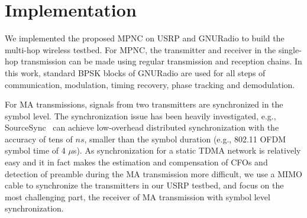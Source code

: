 \section{Implementation}
We implemented the proposed MPNC on USRP and GNURadio to build the multi-hop wireless testbed.
For MPNC, the transmitter and receiver in the single-hop transmission can be made using regular transmission and reception chains. In this work, standard BPSK blocks of GNURadio are used for all steps of communication, modulation, timing recovery, phase tracking and demodulation.

For  MA transmissions, signals from two transmitters are synchronized in the symbol level. The synchronization issue has been heavily investigated, e.g.,
SourceSync~\cite{sourcesync} can achieve low-overhead distributed synchronization with the accuracy of tens of $ns$, 
smaller than the symbol duration (e.g., 802.11 OFDM symbol time of 4 $\mu$s).
 As synchronization for a static TDMA network is relatively easy and it in fact makes the estimation and compensation of CFOs and detection of preamble during the MA transmission more difficult, we use a MIMO cable to synchronize the transmitters in our USRP testbed, and focus on the most challenging part,  the receiver of MA transmission with symbol level synchronization.

